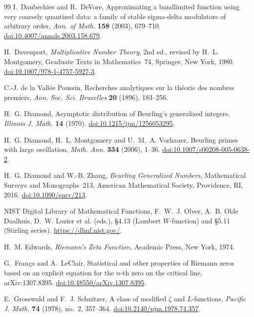 \documentclass[11pt,reqno]{amsart}
\numberwithin{equation}{section}
\theoremstyle{plain}
\theoremstyle{definition}
\theoremstyle{remark}
\begin{document}
\begin{thebibliography}{99}
I.~Daubechies and R.~DeVore, Approximating a bandlimited function using very coarsely quantized data: a family of stable sigma-delta modulators of arbitrary order, \emph{Ann. of Math.} \textbf{158} (2003), 679--710.
\href{https://doi.org/10.4007/annals.2003.158.679}{doi:10.4007/annals.2003.158.679}.

H.~Davenport, \emph{Multiplicative Number Theory}, 2nd ed., revised by H.~L. Montgomery, Graduate Texts in Mathematics~74, Springer, New York, 1980.
\href{https://doi.org/10.1007/978-1-4757-5927-3}{doi:10.1007/978-1-4757-5927-3}.

C.-J. de la Vall\'ee Poussin, Recherches analytiques sur la th\'eorie des nombres premiers, \emph{Ann. Soc. Sci. Bruxelles} \textbf{20} (1896), 183--256.

H.~G. Diamond, Asymptotic distribution of Beurling's generalized integers, \emph{Illinois J. Math.} \textbf{14} (1970).
\href{https://doi.org/10.1215/ijm/1256053295}{doi:10.1215/ijm/1256053295}.

H.~G. Diamond, H.~L. Montgomery and U.~M.~A. Vorhauer, Beurling primes with large oscillation, \emph{Math. Ann.} \textbf{334} (2006), 1--36.
\href{https://doi.org/10.1007/s00208-005-0638-2}{doi:10.1007/s00208-005-0638-2}.

H.~G. Diamond and W.-B. Zhang, \emph{Beurling Generalized Numbers}, Mathematical Surveys and Monographs~213, American Mathematical Society, Providence, RI, 2016.
\href{https://doi.org/10.1090/surv/213}{doi:10.1090/surv/213}.

NIST Digital Library of Mathematical Functions, F.~W.~J. Olver, A.~B. Olde Daalhuis, D.~W. Lozier et al. (eds.), \S4.13 (Lambert $W$-function) and \S5.11 (Stirling series).
\url{https://dlmf.nist.gov/}.

H.~M. Edwards, \emph{Riemann's Zeta Function}, Academic Press, New York, 1974.

G.~Fran\c{c}a and A.~LeClair, Statistical and other properties of Riemann zeros based on an explicit equation for the $n$-th zero on the critical line, arXiv:1307.8395.
\href{https://doi.org/10.48550/arXiv.1307.8395}{doi:10.48550/arXiv.1307.8395}.

E.~Grosswald and F.~J. Schnitzer, A class of modified $\zeta$ and $L$-functions, \emph{Pacific J. Math.} \textbf{74} (1978), no.~2, 357--364.
\href{https://doi.org/10.2140/pjm.1978.74.357}{doi:10.2140/pjm.1978.74.357}.


\end{thebibliography}
\end{document}
